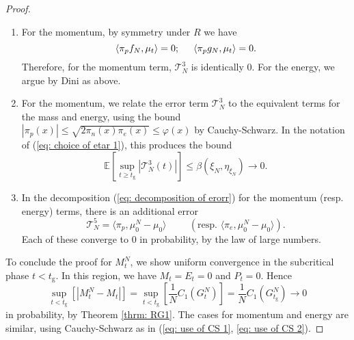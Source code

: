 \documentclass[11pt, notitlepage]{article}
\begin{document}
\begin{proof}
\begin{enumerate}[label=\roman{*}).]
       \item For the momentum, by symmetry under $R$ we have \begin{equation}
           \langle \pi_p f_N, \mu_t\rangle =0; \hspace{0.5cm} \langle \pi_p g_N, \mu_t\rangle =0.
       \end{equation} Therefore, for the momentum term, $\mathcal{T}^3_N$ is identically $0$. For the energy, we argue by Dini as above.
       \item For the momentum, we relate the error term $\mathcal{T}^3_N$ to the equivalent terms for the mass and energy, using the bound $|\pi_p(x)|\le\sqrt{2\pi_n(x)\pi_e(x)} \le \varphi(x)$ by Cauchy-Schwarz. In the notation of (\ref{eq: choice of etar 1}), this produces the bound \begin{equation}
           \mathbb{E}\left[\sup_{t\geq t_\mathrm{g}} |\mathcal{T}^3_N(t)|\right] \leq \beta(\xi_N,\eta_{\xi_N})\rightarrow 0.
       \end{equation}
       \item In the decomposition (\ref{eq: decomposition of erorr}) for the momentum (resp. energy) terms, there is an additional error \begin{equation}
           \mathcal{T}^5_N = \langle \pi_p, \mu^N_0-\mu_0\rangle \hspace{1cm}\left(\text{resp. } \langle \pi_e, \mu^N_0-\mu_0\rangle\right).
       \end{equation} Each of these converge to $0$ in probability, by the law of large numbers.
   \end{enumerate} \bigskip  To conclude the proof for $M^N_t$, we show uniform convergence in the subcritical phase $t<t_\mathrm{g}$. In this region, we have $M_t=E_t=0$ and $P_t=0$. Hence \begin{equation}
       \sup_{t<t_\mathrm{g}} \left[|M^N_t-M_t|\right] = \sup_{t<t_\mathrm{g}}\left[ \frac{1}{N}C_1(G^N_t)\right]=\frac{1}{N}C_1(G^N_{t_\mathrm{g}}) \rightarrow 0
   \end{equation} in probability, by Theorem \ref{thrm: RG1}. The cases for momentum and energy are similar, using Cauchy-Schwarz as in (\ref{eq: use of CS 1}, \ref{eq: use of CS 2}). \end{proof} 
   
\end{document}

